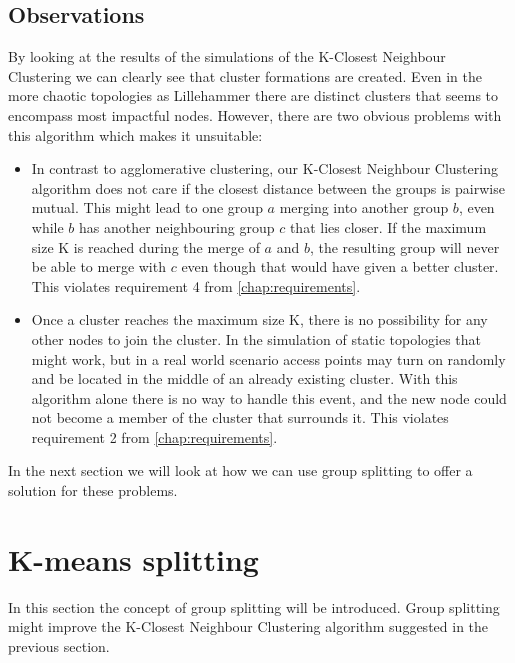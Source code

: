 \subsection{Observations}
By looking at the results of the simulations of the K-Closest Neighbour Clustering we can clearly see that cluster formations are created.
Even in the more chaotic topologies as Lillehammer there are distinct clusters that seems to encompass most impactful nodes. However, there are two obvious problems with this algorithm
which makes it unsuitable:

\begin{itemize}
	\item In contrast to agglomerative clustering, our K-Closest Neighbour Clustering algorithm does not care if the closest distance between the groups is pairwise mutual. This
		might lead to one group $a$ merging into another group $b$, even while $b$ has another neighbouring group $c$ that lies closer. If the maximum size K is reached during the merge of
		$a$ and $b$,  the resulting group will never be able to merge with $c$ even though that would have given a better cluster. This violates requirement 4 from \ref{chap:requirements}. 
	\item Once a cluster reaches the maximum size K, there is no possibility for any other nodes to join the cluster.
		In the simulation of static topologies that might work, but in a real world scenario access points may turn on randomly and be located in the middle of an already existing cluster.
		With this algorithm alone there is no way to handle this event, and the new node could not become a member of the cluster that surrounds it. This violates requirement 2 from \ref{chap:requirements}.
\end{itemize}
In the next section we will look at how we can use group splitting to offer a solution for these problems.

\section{K-means splitting}
In this section the concept of group splitting will be introduced. Group splitting might improve the K-Closest Neighbour Clustering algorithm suggested in the previous section.

